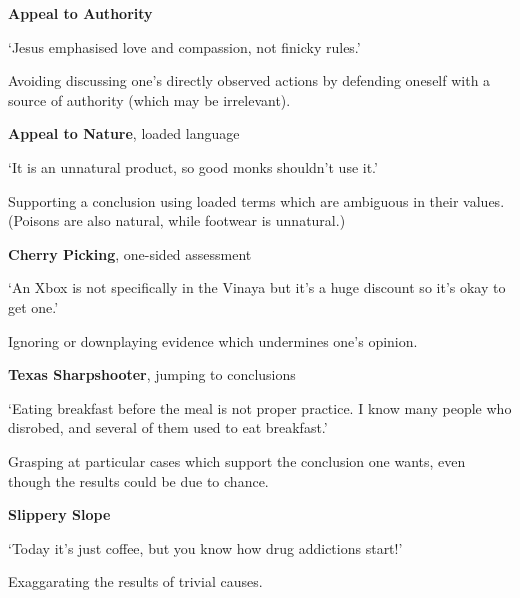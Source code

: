 \textbf{Appeal to Authority}

`Jesus emphasised love and compassion, not finicky rules.'

Avoiding discussing one's directly observed actions by defending oneself
with a source of authority (which may be irrelevant).

\textbf{Appeal to Nature}, loaded language

`It is an unnatural product, so good monks shouldn't use it.'

Supporting a conclusion using loaded terms which are ambiguous in their
values. (Poisons are also natural, while footwear is unnatural.)

\textbf{Cherry Picking}, one-sided assessment

`An Xbox is not specifically in the Vinaya but it's a huge discount so
it's okay to get one.'

Ignoring or downplaying evidence which undermines one's opinion.

\textbf{Texas Sharpshooter}, jumping to conclusions

`Eating breakfast before the meal is not proper practice. I know many
people who disrobed, and several of them used to eat breakfast.'

Grasping at particular cases which support the conclusion one wants,
even though the results could be due to chance.

\textbf{Slippery Slope}

`Today it's just coffee, but you know how drug addictions start!'

Exaggarating the results of trivial causes.

